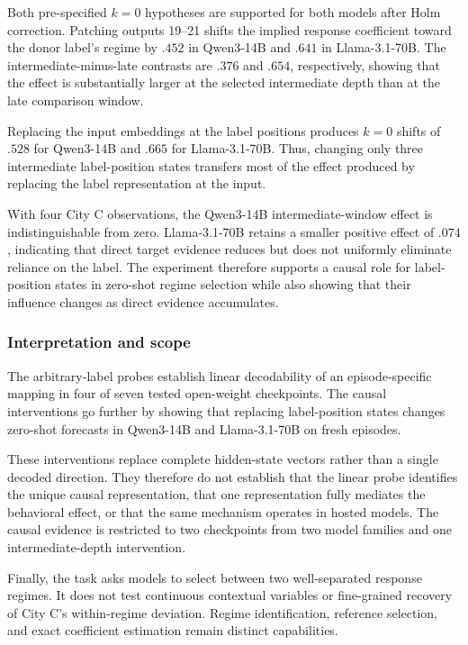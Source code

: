 Both pre-specified \(k=0\) hypotheses are supported for both models after Holm correction.
Patching outputs 19--21 shifts the implied response coefficient toward the donor label's regime by $.452$ in Qwen3-14B and $.641$ in Llama-3.1-70B.
The intermediate-minus-late contrasts are $.376$ and $.654$, respectively, showing that the effect is substantially larger at the selected intermediate depth than at the late comparison window.

Replacing the input embeddings at the label positions produces \(k=0\) shifts of $.528$ for Qwen3-14B and $.665$ for Llama-3.1-70B.
Thus, changing only three intermediate label-position states transfers most of the effect produced by replacing the label representation at the input.

With four City C observations, the Qwen3-14B intermediate-window effect is indistinguishable from zero.
Llama-3.1-70B retains a smaller positive effect of $.074$, indicating that direct target evidence reduces but does not uniformly eliminate reliance on the label.
The experiment therefore supports a causal role for label-position states in zero-shot regime selection while also showing that their influence changes as direct evidence accumulates.

\subsubsection{Interpretation and scope}

The arbitrary-label probes establish linear decodability of an episode-specific mapping in four of seven tested open-weight checkpoints.
The causal interventions go further by showing that replacing label-position states changes zero-shot forecasts in Qwen3-14B and Llama-3.1-70B on fresh episodes.

These interventions replace complete hidden-state vectors rather than a single decoded direction.
They therefore do not establish that the linear probe identifies the unique causal representation, that one representation fully mediates the behavioral effect, or that the same mechanism operates in hosted models.
The causal evidence is restricted to two checkpoints from two model families and one intermediate-depth intervention.

Finally, the task asks models to select between two well-separated response regimes.
It does not test continuous contextual variables or fine-grained recovery of City C's within-regime deviation.
Regime identification, reference selection, and exact coefficient estimation remain distinct capabilities.

